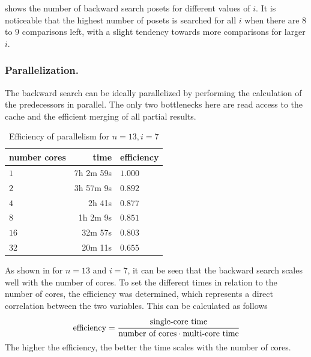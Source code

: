 \documentclass[twoside,leqno,twocolumn]{article}
\begin{document}
 shows the number of backward search posets for different values of $i$.
It is noticeable that the highest number of posets is searched for all $i$ when there are $8$ to $9$ comparisons left, with a slight tendency towards more comparisons for larger $i$.


\subsubsection{Parallelization.} \label{sec:backward:parallelisation}

The backward search can be ideally parallelized by performing the calculation of the predecessors in parallel.
The only two bottlenecks here are read access to the cache and the efficient merging of all partial results.

\begin{table}[!t]
  \renewcommand{\arraystretch}{1.2}
  \caption{Efficiency of parallelism for $n = 13, i = 7$}
  \label{table:backward-parallel}
  \centering
  \begin{tabular}{l|r|l}
    \textbf{number cores} & \textbf{time} & \textbf{efficiency} \\
    \hline
    $1$                   & 7h 2m 59s     & $1.000$             \\
    $2$                   & 3h 57m 9s     & $0.892$             \\
    $4$                   & 2h 41s        & $0.877$             \\
    $8$                   & 1h 2m 9s      & $0.851$             \\
    $16$                  & 32m 57s       & $0.803$             \\
    $32$                  & 20m 11s       & $0.655$             \\
  \end{tabular}
\end{table}

As shown in  for $n = 13$ and $i = 7$, it can be seen that the backward search scales well with the number of cores.
To set the different times in relation to the number of cores, the efficiency was determined, which represents a direct correlation between the two variables.
This can be calculated as follows
\[
  \text{efficiency} = \cfrac{\text{single-core time}}{\text{number of cores} \cdot \text{multi-core time}}
\]
The higher the efficiency, the better the time scales with the number of cores.
\end{document}
